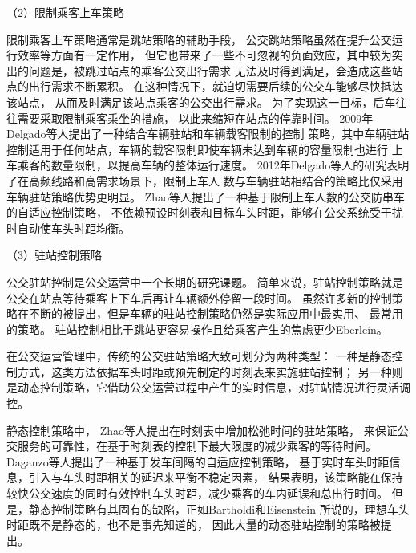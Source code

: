 （2）限制乘客上车策略

限制乘客上车策略通常是跳站策略的辅助手段，
公交跳站策略虽然在提升公交运行效率等方面有一定作用，
但它也带来了一些不可忽视的负面效应，其中较为突出的问题是，被跳过站点的乘客公交出行需求
无法及时得到满足，会造成这些站点的出行需求不断累积。
在这种情况下，就迫切需要后续的公交车能够尽快抵达该站点，
从而及时满足该站点乘客的公交出行需求。
为了实现这一目标，后车往往需要采取限制乘客乘坐的措施，
以此来缩短在站点的停靠时间。
2009年Delgado等人\cite{delgado2009real}提出了一种结合车辆驻站和车辆载客限制的控制
策略，其中车辆驻站控制适用于任何站点，车辆的载客限制即使车辆未达到车辆的容量限制也进行
上车乘客的数量限制，以提高车辆的整体运行速度。
2012年Delgado等人\cite{delgado2012much}的研究表明了在高频线路和高需求场景下，限制上车人
数与车辆驻站相结合的策略比仅采用车辆驻站策略优势更明显。
Zhao等人\cite{zhao2016self}提出了一种基于限制上车人数的公交防串车的自适应控制策略，
不依赖预设时刻表和目标车头时距，能够在公交系统受干扰时自动使车头时距均衡。

（3）驻站控制策略

公交驻站控制是公交运营中一个长期的研究课题\cite{daganzo2019public}。
简单来说，驻站控制策略就是公交在站点等待乘客上下车后再让车辆额外停留一段时间。
虽然许多新的控制策略在不断的被提出，但是车辆的驻站控制策略仍然是实际应用中最实用、
最常用的策略。
驻站控制相比于跳站更容易操作且给乘客产生的焦虑更少Eberlein\cite{eberlein2001holding}。

在公交运营管理中，传统的公交驻站策略大致可划分为两种类型：
一种是静态控制方式，这类方法依据车头时距或预先制定的时刻表来实施驻站控制；
另一种则是动态控制策略，它借助公交运营过程中产生的实时信息，对驻站情况进行灵活调控。

静态控制策略中，
Zhao等人\cite{zhao2006optimal}提出在时刻表中增加松弛时间的驻站策略，
来保证公交服务的可靠性，在基于时刻表的控制下最大限度的减少乘客的等待时间。
Daganzo等人\cite{daganzo2009headway}提出了一种基于发车间隔的自适应控制策略，
基于实时车头时距信息，引入与车头时距相关的延迟来平衡不稳定因素，
结果表明，该策略能在保持较快公交速度的同时有效控制车头时距，减少乘客的车内延误和总出行时间。
但是，静态控制策略有其固有的缺陷，正如Bartholdi和Eisenstein\cite{bartholdi2012self}
所说的，理想车头时距既不是静态的，也不是事先知道的，
因此大量的动态驻站控制的策略被提出。

